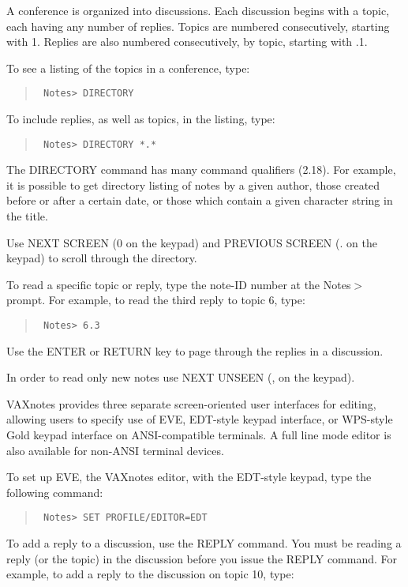 A conference is organized into discussions.  Each discussion begins with a
topic, each having any number of replies.  Topics are numbered consecutively,
starting with 1.  Replies are also numbered consecutively, by topic, starting
with .1.

To see a listing of the topics in a conference, type:

\begin{quote}\tt
Notes> DIRECTORY
\end{quote}

To include replies, as well as topics, in the listing, type:

\begin{quote}\tt
Notes> DIRECTORY *.*
\end{quote}

The DIRECTORY command has many command qualifiers (2.18). For example,
it is possible to get directory listing of notes by a given author,
those created before or after a certain date, or those which contain a given
character string in the title.

Use NEXT SCREEN (0 on the keypad) and PREVIOUS SCREEN (. on the keypad)
to scroll through the directory.

To read a specific topic or reply, type the note-ID number at the Notes$>$
prompt.  For example, to read the third reply to topic 6, type:

\begin{quote}\tt
Notes> 6.3
\end{quote}

Use the ENTER or RETURN key to page through the replies in a discussion.

In order to read only new notes use NEXT UNSEEN (, on the keypad).

VAXnotes provides three separate screen-oriented user interfaces for
editing, allowing users to specify use of EVE, EDT-style keypad
interface, or WPS-style Gold keypad interface on ANSI-compatible terminals.
A full line mode editor is also available for non-ANSI terminal devices.

To set up EVE, the VAXnotes editor, with the EDT-style keypad, type the
following command:

\begin{quote}\tt
Notes> SET PROFILE/EDITOR=EDT
\end{quote}

To add a reply to a discussion, use the REPLY command.  You must be reading
a reply (or the topic) in the discussion before you issue the REPLY command.
For example, to add a reply to the discussion on topic 10, type:

